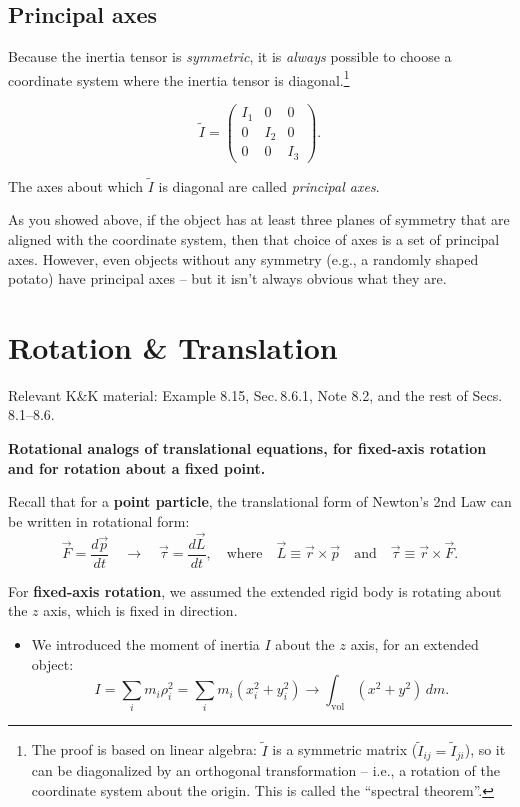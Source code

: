 \documentclass[11pt, letterpaper, openany]{book}
\begin{document}
\section*{Principal axes}

Because the inertia tensor is \textit{symmetric}, it is \textit{always} possible to choose a coordinate system where the inertia tensor is diagonal.\footnote{The proof is based on linear algebra: $\tilde{I}$ is a symmetric matrix ($\tilde{I}_{ij} = \tilde{I}_{ji}$), so it can be diagonalized by an orthogonal transformation -- i.e., a rotation of the coordinate system about the origin. This is called the ``spectral theorem''.}

\[ \tilde{I} = \begin{pmatrix} I_1 & 0 & 0 \\ 0 & I_2 & 0 \\ 0 & 0 & I_3 \end{pmatrix}. \]

The axes about which $\tilde{I}$ is diagonal are called \textit{principal axes}.

As you showed above, if the object has at least three planes of symmetry that are aligned with the coordinate system, then that choice of axes is a set of principal axes. However, even objects without any symmetry (e.g., a randomly shaped potato) have principal axes -- but it isn't always obvious what they are.

\chapter{Rotation \& Translation}

Relevant K\&K material: Example 8.15, Sec.\,8.6.1, Note 8.2, and the rest of Secs.\,8.1--8.6.

\textbf{Rotational analogs of translational equations, for fixed-axis rotation and for rotation about a fixed point.}

Recall that for a \textbf{point particle}, the translational form of Newton's 2nd Law can be written in rotational form:
\[ \vec{F} = \frac{d\vec{p}}{dt} \quad \longrightarrow \quad \vec{\tau} = \frac{d\vec{L}}{dt}, \quad \text{where} \quad \vec{L} \equiv \vec{r} \times \vec{p} \quad \text{and} \quad \vec{\tau} \equiv \vec{r} \times \vec{F}. \]

For \textbf{fixed-axis rotation}, we assumed the extended rigid body is rotating about the $z$ axis, which is fixed in direction.
\begin{itemize}
    \item We introduced the moment of inertia $I$ about the $z$ axis, for an extended object:
    \[ I = \sum_i m_i \rho_i^2 = \sum_i m_i(x_i^2 + y_i^2) \longrightarrow \int_{\text{vol}} (x^2 + y^2)\,dm. \]
\end{itemize}
\end{document}
